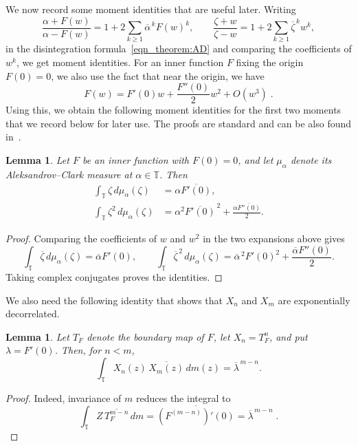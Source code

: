 \documentclass[12pt, reqno, final, a4paper]{amsart}
\theoremstyle{plain}
\newtheorem{lemma}[theorem]{Lemma}
\theoremstyle{definition}
\theoremstyle{remark}
\newcommand{\T}{\mathbb T}
\newcommand{\1}{\mathbf 1}
\begin{document}
We now record some moment identities that are useful later. Writing
\[
        \frac{\alpha+F(w)}{\alpha-F(w)}
        =1+2\sum_{k\ge 1}\overline\alpha^{\,k} F(w)^k, \qquad 
        \frac{\zeta+w}{\zeta-w}
        =1+2\sum_{k\ge 1}\overline\zeta^{\,k} w^k, 
\]
in the disintegration formula~\eqref{eqn_theorem:AD} and
comparing the coefficients of $w^{k}$, we get moment identities. For an inner function $F$ fixing the origin $F(0)=0$, we also use the fact that near the origin, we have
\[
F(w) = F'(0)w+ \frac{F''(0)}{2}w^2 + O(w^3)\;.
\]
Using this, we obtain the following moment identities for the first two moments that we record below for later use. The proofs are standard and can be also found in~\cite{NicolauSoler2022}.
\begin{lemma}\label{lemma_measure}
Let $F$ be an inner function with $F(0)=0$, and let $\mu_\alpha$ denote its
Aleksandrov--Clark measure at $\alpha\in\mathbb T$. Then
\begin{align}
 \int_{\T}\zeta\,d\mu_\alpha(\zeta)
 &=\alpha\overline{F'(0)}, \label{eqn:FirstMoment}\\
 \int_{\T}\zeta^2\,d\mu_\alpha(\zeta)
 &=\alpha^2\overline{F'(0)}^{\,2}
   +\frac{\alpha\overline{F''(0)}}{2}. \label{eqn:SecondMoment}
\end{align}
\end{lemma}
\begin{proof}
Comparing the coefficients of $w$ and $w^2$ in the two expansions above gives
\[
 \int_{\T}\overline\zeta\,d\mu_\alpha(\zeta)
 =\overline\alpha F'(0),
 \qquad
 \int_{\T}\overline\zeta^{\,2}\,d\mu_\alpha(\zeta)
 =\overline\alpha^{\,2}F'(0)^2
  +\frac{\overline\alpha F''(0)}2.
\]
Taking complex conjugates proves the identities.
\end{proof}
We also need the following identity that shows that $X_n$ and $X_m$ are exponentially decorrelated. 
\begin{lemma}
    Let $T_F$ denote the boundary map of $F$, let $X_n=T_F^n$, and put
$\lambda=F'(0)$. Then, for $n<m$,
\begin{equation}\label{inner_cauchy}
 \int_{\mathbb T}X_n(z)\,\overline{X_m(z)}\,dm(z)
 =\overline\lambda^{\,m-n}.
\end{equation}
\end{lemma}
\begin{proof}
Indeed, invariance of $m$ reduces the integral to
\[\int_{\T}Z\,\overline{T_F^{m-n}}\,dm=\overline{(F^{(m-n)})'(0)}=\overline\lambda^{\,m-n}\;.\]
\end{proof}
\end{document}

